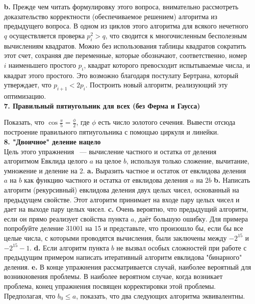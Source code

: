 \noindent\hspace*{15pt}\textbf{b.} Прежде чем читать формулировку этого вопроса, внимательно рассмотреть доказательство корректности (обеспечиваемое решением) алгоритма из предыдущего вопроса. В одном из циклов этого алгоритма для всякого нечетного $q$ осуществляется проверка $p_i^2>q$, что сводится к многочисленным бесполезным вычислениям квадратов. Можно без использования таблицы квадратов сократить этот счет, сохраняя две переменные, которые обозначают, соответственно, номер $i$ наименьшего простого $p_{i}$, квадрат которого превосходит испытываемые числа, и квадрат этого простого. Это возможно благодаря постулату Бертрана, который утверждает, что $p_{i+1}<2p_{i}$. Построить новый алгоритм, реализующий эту оптимизацию.\newline 
\\

\noindent\textbf{ 7. Правильный пятиугольник для всех (без Ферма и Гаусса)}\ \newline

Показать, что $ \cos{\frac{\pi}{5}}=\frac{\phi}{2}$, где $\phi$ есть число золотого сечения. Вывести отсюда построение правильного пятиугольника с помощью циркуля и линейки.\newline
\\

\noindent\textbf { 8. "Двоичное" деление нацело}\ \newline
\\
Цель этого упражнения ~--- вычисление частного и остатка от деления алгоритмом Евклида целого $a$ на целое $b$, используя только сложение, вычитание, умножение и деление на 2.\newline
\hspace*{15pt}\textbf{ a.} Выразить частное и остаток от евклидова деления $a$ на $b$ как функцию частного и остатка от евклидова деления $a$ на $2b$\newline
\hspace*{15pt}\textbf{ b.} Написать алгоритм (рекурсивный) евклидова деления двух целых чисел, основанный на предыдущем свойстве. Этот алгоритм принимает на входе пару целых чисел и дает на выходе пару целых чисел.\newline
\hspace*{15pt}\textbf{ c.} Очень вероятно, что предыдущий алгоритм, если он прямо реализует свойства пункта $a$, даёт большую ошибку. Для примера попробуйте деление 31001 на 15 и представьте, что произошло бы, если бы все целые числа, с которыми проводятся вычисления, были заключены между $-2^{15}$ и $-2^{15}-1$. \newline
\hspace*{15pt}\textbf{ d.} Если алгоритм пункта $b$ не вызвал особых сложностей при работе с предыдущим примером написать итеративный алгоритм евклидова "бинарного" деления. \newline
\hspace*{15pt}\textbf{ e.} В конце упражнения рассматривается случай, наиболее вероятный для возникновения проблемы. В наиболее вероятном случае, когда возникает проблема, конец упражнения посвящен корректировки этой проблемы.  Предполагая, что $b_{0}\leq{a}$, показать, что два следующих алгоритма эквивалентны. \newline

